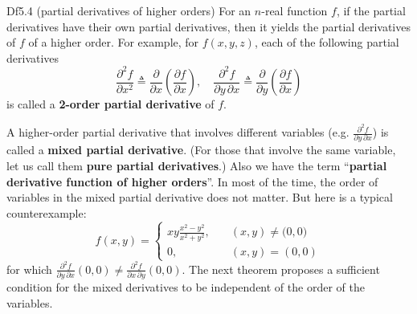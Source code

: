 \documentclass{article}
\newcommand{\parfrac}[2]{\frac{\partial #1}{\partial #2}}
\newcommand{\biparfrac}[2]{\frac{\partial^2 #1}{#2}}
\begin{document}
\begin{Df}{Df5.4 (partial derivatives of higher orders)}
    For an $n$-real function $f$, if the partial derivatives have their own partial derivatives, then it yields the partial derivatives of $f$ of a higher order. For example, for $f(x,y,z)$, each of the following partial derivatives
    $$ \biparfrac{f}{\partial x^2} \triangleq \parfrac{}{x}\left(\parfrac{f}{x}\right), \quad \biparfrac{f}{\partial y\,\partial x} \triangleq \parfrac{}{y}\left(\parfrac{f}{x}\right) $$
    is called a \textbf{2-order partial derivative} of $f$.
\end{Df}

\begin{Rmk}{}
    \textcolor{Df}{A higher-order partial derivative that involves different variables (e.g. $\biparfrac{f}{\partial y\,\partial x}$) is called a \textbf{mixed partial derivative}. (For those that involve the same variable, let us call them \textbf{pure partial derivatives}.)} \textcolor{Df}{Also we have the term ``\textbf{partial derivative function of higher orders}''.}
    In most of the time, the order of variables in the mixed partial derivative does not matter. \textcolor{Th}{But here is a typical counterexample:
    $$ f(x,y) = \begin{cases}
        xy\frac{x^2-y^2}{x^2+y^2},\quad & (x,y)\neq\pmb (0,0)\\
        0, & (x,y) = (0,0)
    \end{cases}
    $$
    for which $\biparfrac{f}{\partial y\,\partial x}(0,0)\neq\biparfrac{f}{\partial x\,\partial y}(0,0)$.}
    The next theorem proposes a sufficient condition for the mixed derivatives to be independent of the order of the variables.
\end{Rmk}
\end{document}
